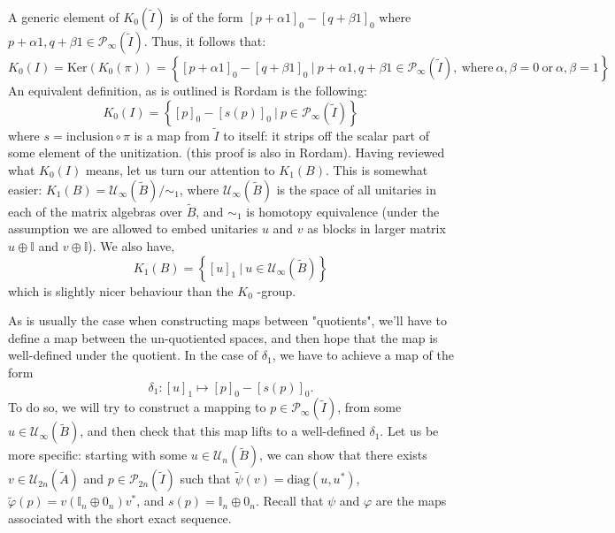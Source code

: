 \documentclass[aps,pra,showpacs,notitlepage,onecolumn,superscriptaddress,nofootinbib]{revtex4-1}
\theoremstyle{definition}
\begin{document}
A generic element of $K_0(\widetilde{I})$ is of the form $[p + \alpha 1]_0 - [q + \beta 1]_0$ where $p + \alpha 1, q + \beta 1 \in \mathcal{P}_{\infty}(\widetilde{I})$. Thus,
it follows that:
\begin{equation}
K_0(I) = \text{Ker}(K_0(\pi)) = \left\{ [p + \alpha 1]_0 - [q + \beta 1]_0 \ \big| \ p + \alpha 1, q + \beta 1 \in \mathcal{P}_{\infty}(\widetilde{I}), \ \text{where} \ \alpha, \beta = 0 \ \text{or} \ \alpha, \beta = 1 \right\}
\end{equation}
An equivalent definition, as is outlined is Rordam is the following:
\begin{equation}
K_0(I) = \left\{[p]_0 - [s(p)]_0 \ \big| \ p \in \mathcal{P}_{\infty}(\widetilde{I})\right\}
\end{equation}
where $s = \text{inclusion} \circ \pi$ is a map from $\widetilde{I}$ to itself: it strips off the scalar part of some element of the unitization.
(this proof is also in Rordam). Having reviewed what $K_0(I)$ means, let us turn our attention to $K_1(B)$. This is somewhat easier: $K_1(B) = \mathcal{U}_{\infty}(\widetilde{B}) / \sim_1$,
where $\mathcal{U}_{\infty}(\widetilde{B})$ is the space of all unitaries in each of the matrix algebras over $\widetilde{B}$, and $\sim_1$ is homotopy equivalence (under the assumption
we are allowed to embed unitaries $u$ and $v$ as blocks in larger matrix $u \oplus \mathbb{I}$ and $v \oplus \mathbb{I}$). We also have,
\begin{equation}
K_1(B) = \left\{[u]_1 \ \big| \ u \in \mathcal{U}_{\infty}(\widetilde{B}) \right\}
\end{equation}
which is slightly nicer behaviour than the $K_0$ -group.

As is usually the case when constructing maps between "quotients", we'll have to define a map between the un-quotiented spaces, and
then hope that the map is well-defined under the quotient. In the case of $\delta_1$, we have to achieve a map of the form
\begin{equation}
\delta_1 : [u]_1 \mapsto [p]_0 - [s(p)]_0.
\end{equation}
To do so, we will try to construct a mapping to $p \in \mathcal{P}_{\infty}(\widetilde{I})$, from some $u \in \mathcal{U}_{\infty}(\widetilde{B})$,
and then check that this map lifts to a well-defined $\delta_1$. Let us be more specific: starting with some $u \in \mathcal{U}_{n}(\widetilde{B})$,
we can show that there exists $v \in \mathcal{U}_{2n}(\widetilde{A})$ and $p \in \mathcal{P}_{2n}(\widetilde{I})$ such that $\widetilde{\psi}(v) = \text{diag}(u, u^{*})$,
$\widetilde{\varphi}(p) = v (\mathbb{I}_n \oplus 0_n) v^{*}$, and $s(p) = \mathbb{I}_n \oplus 0_n$. Recall that $\psi$ and $\varphi$ are the maps associated with the short exact sequence.
\end{document}
